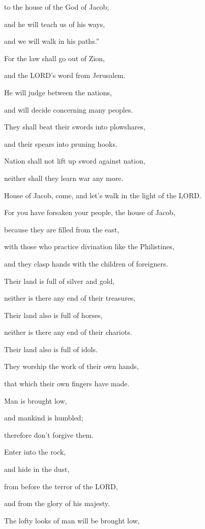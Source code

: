 to the house of the God of Jacob;

and he will teach us of his ways,

and we will walk in his paths.”

For the law shall go out of Zion,

and the LORD’s word from Jerusalem.

\myverse{}He will judge between the nations,

and will decide concerning many peoples.

They shall beat their swords into plowshares,

and their spears into pruning hooks.

Nation shall not lift up sword against nation,

neither shall they learn war any more.


\vspace{\baselineskip} \myverse{}House of Jacob, come, and let’s walk in the light of the LORD.

\myverse{}For you have forsaken your people, the house of Jacob,

because they are filled from the east,

with those who practice divination like the Philistines,

and they clasp hands with the children of foreigners.

\myverse{}Their land is full of silver and gold,

neither is there any end of their treasures.

Their land also is full of horses,

neither is there any end of their chariots.

\myverse{}Their land also is full of idols.

They worship the work of their own hands,

that which their own fingers have made.

\myverse{}Man is brought low,

and mankind is humbled;

therefore don’t forgive them.

\myverse{}Enter into the rock,

and hide in the dust,

from before the terror of the LORD,

and from the glory of his majesty.

\myverse{}The lofty looks of man will be brought low,

